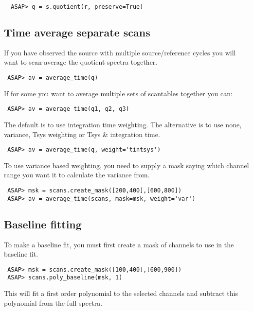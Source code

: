 \documentclass[11pt]{article}
\begin{document}
\begin{verbatim}
  ASAP> q = s.quotient(r, preserve=True)
\end{verbatim}

\subsection{Time average separate scans}

If you have observed the source with multiple source/reference cycles you
will want to scan-average the quotient spectra together.

\begin{verbatim}
 ASAP> av = average_time(q)
\end{verbatim}

If for some you want to average multiple sets of scantables together
you can:

\begin{verbatim}
 ASAP> av = average_time(q1, q2, q3)
\end{verbatim}

The default is to use integration time weighting. The alternative is
to use none, variance, Tsys weighting or Tsys \& integration time.

\begin{verbatim}
 ASAP> av = average_time(q, weight='tintsys')
\end{verbatim}

To use variance based weighting, you need to supply a mask saying which
channel range you want it to calculate the variance from.

\begin{verbatim}
 ASAP> msk = scans.create_mask([200,400],[600,800])
 ASAP> av = average_time(scans, mask=msk, weight='var')
\end{verbatim}

\subsection{Baseline fitting}

To make a baseline fit, you must first create a mask of channels to
use in the baseline fit.

\begin{verbatim}
 ASAP> msk = scans.create_mask([100,400],[600,900])
 ASAP> scans.poly_baseline(msk, 1)
\end{verbatim}

This will fit a first order polynomial to the selected channels and subtract
this polynomial from the full spectra.
\end{document}
